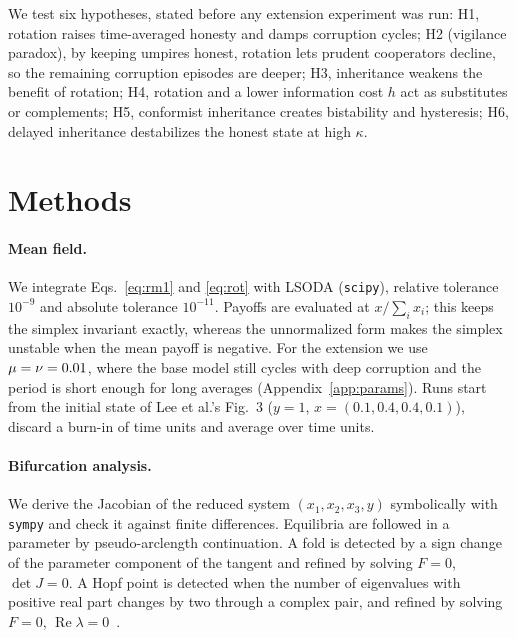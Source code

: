 \documentclass[11pt]{article}
\begin{document}
We test six hypotheses, stated before any extension experiment was run:
H1, rotation raises time-averaged honesty and damps corruption cycles;
H2 (vigilance paradox), by keeping umpires honest, rotation lets prudent cooperators decline, so
the remaining corruption episodes are deeper;
H3, inheritance weakens the benefit of rotation;
H4, rotation and a lower information cost $h$ act as substitutes or complements;
H5, conformist inheritance creates bistability and hysteresis;
H6, delayed inheritance destabilizes the honest state at high $\kappa$.

\section{Methods}\label{sec:methods}

\paragraph{Mean field.} We integrate Eqs.~\eqref{eq:rm1} and \eqref{eq:rot} with LSODA
(\texttt{scipy}), relative tolerance $10^{-9}$ and absolute tolerance $10^{-11}$. Payoffs are
evaluated at $x/\sum_i x_i$; this keeps the simplex invariant exactly, whereas the unnormalized
form makes the simplex unstable when the mean payoff is negative. For the extension we use
$\mu=\nu=0.01$, where the base model still cycles with deep corruption and the period is short
enough for long averages (Appendix~\ref{app:params}). Runs start from the initial state of Lee et
al.'s Fig.~3 ($y=1$, $x=(0.1,0.4,0.4,0.1)$), discard a burn-in of \TBurnMF{} time units and
average over \TWinMF{} time units.

\paragraph{Bifurcation analysis.} We derive the Jacobian of the reduced system $(x_1,x_2,x_3,y)$
symbolically with \texttt{sympy} and check it against finite differences. Equilibria are followed
in a parameter by pseudo-arclength continuation. A fold is detected by a sign change of the
parameter component of the tangent and refined by solving $F=0$, $\det J=0$. A Hopf point is
detected when the number of eigenvalues with positive real part changes by two through a complex
pair, and refined by solving $F=0$, $\operatorname{Re}\lambda=0$~\cite{kuznetsov2004bifurcation}.
\end{document}
